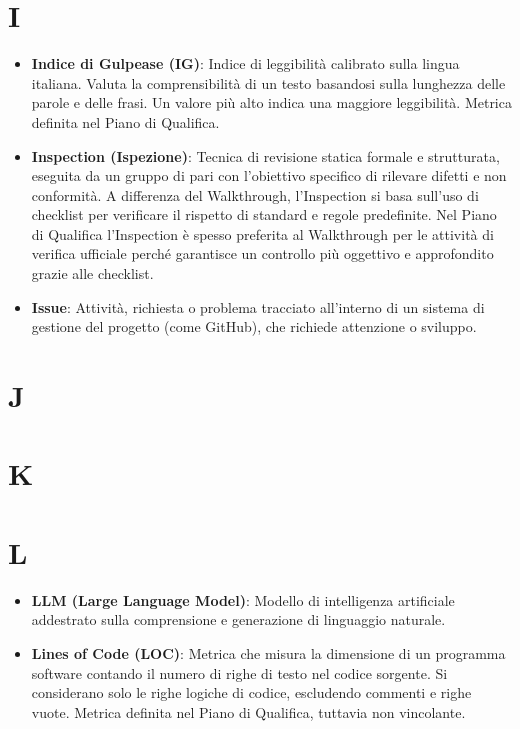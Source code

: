 \documentclass[11pt,a4paper]{article}
\begin{document}
\section*{I}
\begin{itemize}
\item \textbf{Indice di Gulpease (IG)}: Indice di leggibilità calibrato sulla lingua italiana. Valuta la comprensibilità di un testo basandosi sulla lunghezza delle parole e delle frasi. Un valore più alto indica una maggiore leggibilità. Metrica definita nel Piano di Qualifica.

\item \textbf{Inspection (Ispezione)}: Tecnica di revisione statica formale e strutturata, eseguita da un gruppo di pari con l'obiettivo specifico di rilevare difetti e non conformità. A differenza del Walkthrough, l'Inspection si basa sull'uso di checklist per verificare il rispetto di standard e regole predefinite. Nel Piano di Qualifica l'Inspection è spesso preferita al Walkthrough per le attività di verifica ufficiale perché garantisce un controllo più oggettivo e approfondito grazie alle checklist.

\item \textbf{Issue}: Attività, richiesta o problema tracciato all’interno di un sistema di gestione del progetto (come GitHub), che richiede attenzione o sviluppo.

\end{itemize}

\newpage

\section*{J}

\newpage

\section*{K}

\newpage

\section*{L}
\begin{itemize}
\item \textbf{LLM (Large Language Model)}: Modello di intelligenza artificiale addestrato sulla comprensione e generazione di linguaggio naturale.

\item \textbf{Lines of Code (LOC)}: Metrica che misura la dimensione di un programma software contando il numero di righe di testo nel codice sorgente. Si considerano solo le righe logiche di codice, escludendo commenti e righe vuote. Metrica definita nel Piano di Qualifica, tuttavia non vincolante.
\end{itemize}
\newpage
\end{document}
